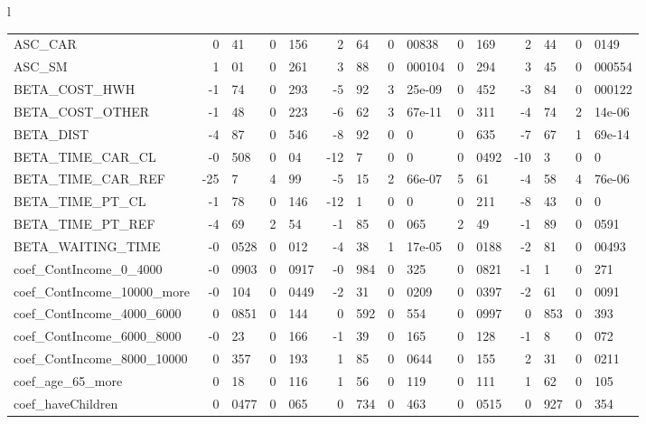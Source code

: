 \documentclass[12pt,a4paper]{article}
\begin{document}
\begin{sidewaystable}[htb]
\begin{tabular}{l}
\begin{tabular}{lr@{.}lr@{.}lr@{.}lr@{.}lr@{.}lr@{.}lr@{.}l}
\hline
ASC\_CAR                    &    0&41 &    0&156 &    2&64 &  0&00838 &         0&169 &         2&44 &        0&0149 \\
ASC\_SM                     &    1&01 &    0&261 &    3&88 & 0&000104 &         0&294 &         3&45 &      0&000554 \\
BETA\_COST\_HWH              &   -1&74 &    0&293 &   -5&92 & 3&25e-09 &         0&452 &        -3&84 &      0&000122 \\
BETA\_COST\_OTHER            &   -1&48 &    0&223 &   -6&62 & 3&67e-11 &         0&311 &        -4&74 &      2&14e-06 \\
BETA\_DIST                  &   -4&87 &    0&546 &   -8&92 &      0&0 &         0&635 &        -7&67 &      1&69e-14 \\
BETA\_TIME\_CAR\_CL           &  -0&508 &     0&04 &   -12&7 &      0&0 &        0&0492 &        -10&3 &           0&0 \\
BETA\_TIME\_CAR\_REF          &   -25&7 &     4&99 &   -5&15 & 2&66e-07 &          5&61 &        -4&58 &      4&76e-06 \\
BETA\_TIME\_PT\_CL            &   -1&78 &    0&146 &   -12&1 &      0&0 &         0&211 &        -8&43 &           0&0 \\
BETA\_TIME\_PT\_REF           &   -4&69 &     2&54 &   -1&85 &    0&065 &          2&49 &        -1&89 &        0&0591 \\
BETA\_WAITING\_TIME          & -0&0528 &    0&012 &   -4&38 & 1&17e-05 &        0&0188 &        -2&81 &       0&00493 \\
coef\_ContIncome\_0\_4000     & -0&0903 &   0&0917 &  -0&984 &    0&325 &        0&0821 &         -1&1 &         0&271 \\
coef\_ContIncome\_10000\_more &  -0&104 &   0&0449 &   -2&31 &   0&0209 &        0&0397 &        -2&61 &        0&0091 \\
coef\_ContIncome\_4000\_6000  &  0&0851 &    0&144 &   0&592 &    0&554 &        0&0997 &        0&853 &         0&393 \\
coef\_ContIncome\_6000\_8000  &   -0&23 &    0&166 &   -1&39 &    0&165 &         0&128 &         -1&8 &         0&072 \\
coef\_ContIncome\_8000\_10000 &   0&357 &    0&193 &    1&85 &   0&0644 &         0&155 &         2&31 &        0&0211 \\
coef\_age\_65\_more           &    0&18 &    0&116 &    1&56 &    0&119 &         0&111 &         1&62 &         0&105 \\
coef\_haveChildren          &  0&0477 &    0&065 &   0&734 &    0&463 &        0&0515 &        0&927 &         0&354 \\

\end{tabular}
\end{tabular}
\end{sidewaystable}
\end{document}
